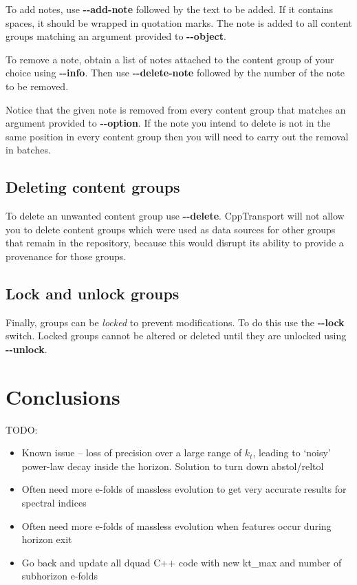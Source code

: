 \documentclass[11pt,a4paper]{article}
\newenvironment{warning}{\begin{tcolorbox}[enhanced,breakable,colback=red!10,colbacktitle=red!20,colframe=red!40,coltitle=black,title={Warning},fonttitle=\sffamily\fontseries{b}\selectfont]}{\end{tcolorbox}}
\newcommand{\packagefont}{\sffamily}
\newcommand{\CppTransport}{{\packagefont CppTransport}}
\newcommand{\option}[1]{{\ttfamily\bfseries\small #1}}
\begin{document}
To add notes, use
\option{{-}{-}add-note}
followed by the text to be added.
If it contains spaces, it should be wrapped in quotation marks.
The note is added to all content groups matching an argument provided
to \option{{-}{-}object}.

To remove a note, obtain a list of notes attached to the content group of your
choice using \option{{-}{-}info}.
Then use \option{{-}{-}delete-note} followed by the number of the note to be
removed.

\begin{warning}
    Notice that the given note is removed from every content group that matches
    an argument provided to \option{{-}{-}option}. If the note you intend to delete
    is not in the same position in every content group then you will need to carry out
    the removal in batches.    
\end{warning}

\subsection{Deleting content groups}
\label{sec:delete-content}

To delete an unwanted content group use \option{{-}{-}delete}.
{\CppTransport} will not allow you to delete content groups which were used
as data sources for other groups that remain in the repository,
because this would disrupt its ability to provide a provenance for those groups.

\subsection{Lock and unlock groups}
\label{sec:lock-unlock}

Finally, groups can be \emph{locked} to prevent modifications. To do this use the
\option{{-}{-}lock} switch.
Locked groups cannot be altered or deleted until they are unlocked using
\option{{-}{-}unlock}.

\section{Conclusions} 

TODO:
\begin{itemize}
    \item Known issue -- loss of precision over a large range of $k_t$, leading
    to `noisy' power-law decay inside the horizon. Solution to turn down
    abstol/reltol
    \item Often need more e-folds of massless evolution to get very accurate
    results for spectral indices
    \item Often need more e-folds of massless evolution when features occur
    during horizon exit
    \item Go back and update all dquad C++ code with new kt\_max and number
    of subhorizon e-folds
\end{itemize}
\end{document}
